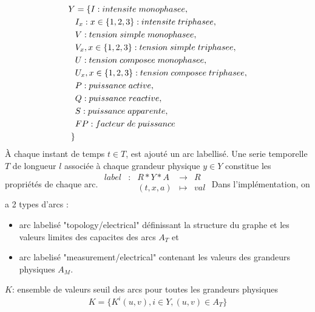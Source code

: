 \documentclass[onecolumn, 12pt]{article}
\begin{document}
\begin{equation} \label{eq1}
\begin{split}
Y & =\{ I : intensite \hspace{0.1 cm} monophasee, \\
&  I_{x} : x \in \{1,2,3\}: intensite \hspace{0.1 cm} triphasee, \\
&  V: tension \hspace{0.1cm} simple \hspace{0.1cm} monophasee,\\
&  V_{x}, x \in \{1,2,3\}: tension \hspace{0.1cm} simple \hspace{0.1cm}triphasee,\\
&  U: tension \hspace{0.1cm} composee \hspace{0.1cm} monophasee,\\
&  U_{x}, x \in \{1,2,3\}: tension \hspace{0.1cm} composee \hspace{0.1cm}triphasee,\\
&  P: puissance \hspace{0.1 cm} active,\\
&  Q: puissance \hspace{0.1 cm} reactive,\\
&  S: puissance \hspace{0.1 cm} apparente,\\
&  FP: facteur \hspace{0.1 cm} de \hspace{0.1 cm} puissance\\
\}
\end{split}
\end{equation}
\`A chaque instant de temps $t \in T$, est ajout\'e un arc labellis\'e. Une serie temporelle $T$ de longueur $l$ associ\'ee \`a chaque grandeur physique $y \in Y$ constitue les propri\'et\'es de chaque arc.
$\begin{array}{ccccc}
label & : & R*Y*A & \to & R  \\
 & & (t, x, a) & \mapsto & val \\
\end{array}$
\newline
Dans l'impl\'ementation, on a 2 types d'arcs :
\begin{itemize}
\item arc labelis\'e "topology/electrical" d\'efinissant la structure du graphe et les valeurs limites des capacites des arcs $A_{T}$ et
\item arc labelis\'e "measurement/electrical" contenant les valeurs des grandeurs physiques $A_{M}$.
\end{itemize}
$K$: ensemble de valeurs seuil des arcs pour toutes les grandeurs physiques
\[K = \{ K^{i}(u, v) , i\in Y, (u,v) \in A_{T} \}  \]
\end{document}

